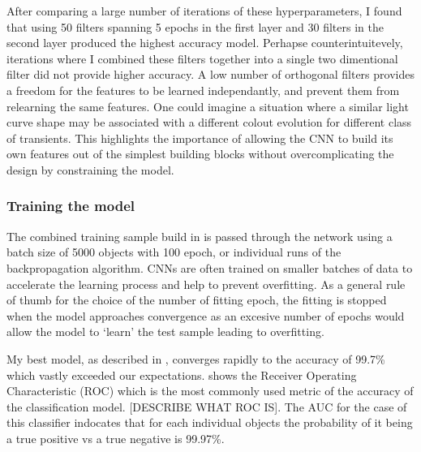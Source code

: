 After comparing a large number of iterations of these hyperparameters, I found that using 50 filters spanning 5 epochs in the first layer and 30 filters in the second layer produced the highest accuracy model. Perhapse counterintuitevely, iterations  where I combined these filters together into a single two dimentional filter did not provide higher accuracy. A low number of orthogonal filters provides a freedom for the features to be learned independantly, and prevent them from relearning the same features. One could imagine a situation where a similar light curve shape may be associated with a different colout evolution for different class of transients. This highlights the importance of allowing the CNN to build its own features out of the simplest building blocks without overcomplicating the design by constraining the model.

\begin{figure}
  \caption{}
  \label{fig:AGNNoiseSNModel}
\end{figure}

\subsubsection{Training the model}
The combined training sample build in  is passed through the network using a batch size of 5000 objects with 100 epoch, or individual runs of the backpropagation algorithm. CNNs are often trained on smaller batches of data to accelerate the learning process and help to prevent overfitting. As a general rule of thumb for the choice of the number of fitting epoch, the fitting is stopped when the model approaches convergence as an excesive number of epochs would allow the model to `learn' the test sample leading to overfitting.

My best model, as described in , converges rapidly to the accuracy of 99.7\% which vastly exceeded our expectations.  shows the Receiver Operating Characteristic (ROC) which is the most commonly used metric of the accuracy of the classification model. [DESCRIBE WHAT ROC IS]. The AUC for the case of this classifier indocates that for each individual objects the probability of it being a true positive vs a true negative is 99.97\%.

